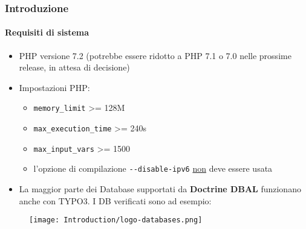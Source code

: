\begin{frame}[fragile]
	\frametitle{Introduzione}
	\framesubtitle{Requisiti di sistema}

	\begin{itemize}
		\item PHP versione 7.2\newline
			\smaller
				(potrebbe essere ridotto a PHP 7.1 o 7.0 nelle prossime release, in attesa di decisione)
			\normalsize

		\item Impostazioni PHP:

			\begin{itemize}
				\item \texttt{memory\_limit} >= 128M
				\item \texttt{max\_execution\_time} >= 240s
				\item \texttt{max\_input\_vars} >= 1500
				\item l'opzione di compilazione \texttt{-}\texttt{-disable-ipv6} \underline{non} deve essere usata
			\end{itemize}

		\item La maggior parte dei Database supportati da \textbf{Doctrine DBAL} funzionano anche con TYPO3.
			I DB verificati sono ad esempio:
	\end{itemize}

	\begin{figure}
		\texttt{[image: Introduction/logo-databases.png]}
	\end{figure}

\end{frame}

